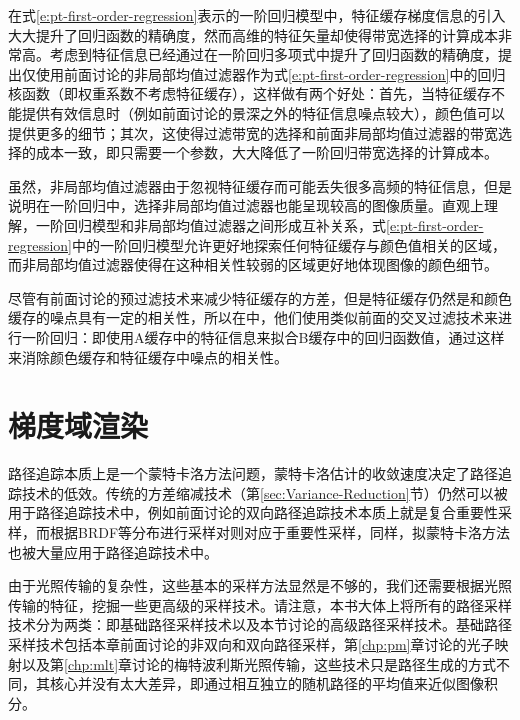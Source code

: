 在式\ref{e:pt-first-order-regression}表示的一阶回归模型中，特征缓存梯度信息的引入大大提升了回归函数的精确度，然而高维的特征矢量却使得带宽选择的计算成本非常高。考虑到特征信息已经通过在一阶回归多项式中提升了回归函数的精确度，\cite{a:NonlinearlyWeightedFirstorderRegressionforDenoisingMonteCarloRenderings}提出仅使用前面讨论的非局部均值过滤器作为式\ref{e:pt-first-order-regression}中的回归核函数（即权重系数不考虑特征缓存），这样做有两个好处：首先，当特征缓存不能提供有效信息时（例如前面讨论的景深之外的特征信息噪点较大），颜色值可以提供更多的细节；其次，这使得过滤带宽的选择和前面非局部均值过滤器的带宽选择的成本一致，即只需要一个参数，大大降低了一阶回归带宽选择的计算成本。

虽然，非局部均值过滤器由于忽视特征缓存而可能丢失很多高频的特征信息，但是\cite{a:NonlinearlyWeightedFirstorderRegressionforDenoisingMonteCarloRenderings}说明在一阶回归中，选择非局部均值过滤器也能呈现较高的图像质量。直观上理解，一阶回归模型和非局部均值过滤器之间形成互补关系，式\ref{e:pt-first-order-regression}中的一阶回归模型允许更好地探索任何特征缓存与颜色值相关的区域，而非局部均值过滤器使得在这种相关性较弱的区域更好地体现图像的颜色细节。

尽管有前面讨论的预过滤技术来减少特征缓存的方差，但是特征缓存仍然是和颜色缓存的噪点具有一定的相关性，所以在\cite{a:NonlinearlyWeightedFirstorderRegressionforDenoisingMonteCarloRenderings}中，他们使用类似前面的交叉过滤技术来进行一阶回归：即使用A缓存中的特征信息来拟合B缓存中的回归函数值，通过这样来消除颜色缓存和特征缓存中噪点的相关性。










\section{梯度域渲染}\label{sec:pt-gradient-domian-path-tracing}
路径追踪本质上是一个蒙特卡洛方法问题，蒙特卡洛估计的收敛速度决定了路径追踪技术的低效。传统的方差缩减技术（第\ref{sec:Variance-Reduction}节）仍然可以被用于路径追踪技术中，例如前面讨论的双向路径追踪技术本质上就是复合重要性采样，而根据BRDF等分布进行采样对则对应于重要性采样，同样，拟蒙特卡洛方法也被大量应用于路径追踪技术中。

由于光照传输的复杂性，这些基本的采样方法显然是不够的，我们还需要根据光照传输的特征，挖掘一些更高级的采样技术。请注意，本书大体上将所有的路径采样技术分为两类：即基础路径采样技术以及本节讨论的高级路径采样技术。基础路径采样技术包括本章前面讨论的非双向和双向路径采样，第\ref{chp:pm}章讨论的光子映射以及第\ref{chp:mlt}章讨论的梅特波利斯光照传输，这些技术只是路径生成的方式不同，其核心并没有太大差异，即通过相互独立的随机路径的平均值来近似图像积分。


